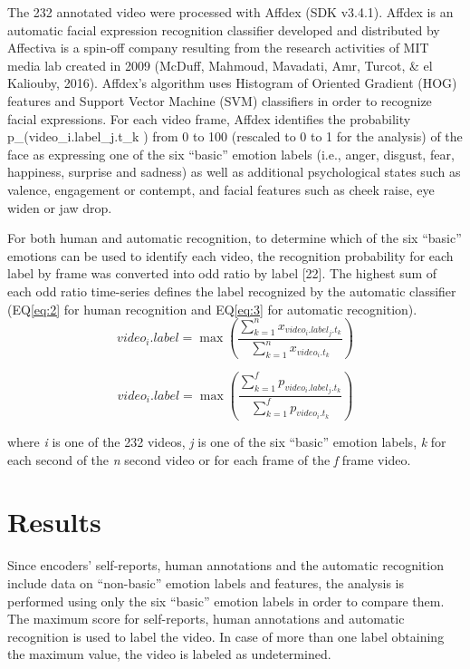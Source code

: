 \documentclass[man]{apa6}
\begin{document}
The 232 annotated video were processed with Affdex (SDK v3.4.1). Affdex is an automatic facial expression recognition classifier developed and distributed by Affectiva is a spin-off company resulting from the research activities of MIT media lab created in 2009 (McDuff, Mahmoud, Mavadati, Amr, Turcot, \& el Kaliouby, 2016). Affdex's algorithm uses Histogram of Oriented Gradient (HOG) features and Support Vector Machine (SVM) classifiers in order to recognize facial expressions. For each video frame, Affdex identifies the probability p\_(video\_i.label\_j.t\_k ) from 0 to 100 (rescaled to 0 to 1 for the analysis) of the face as expressing one of the six \enquote{basic} emotion labels (i.e., anger, disgust, fear, happiness, surprise and sadness) as well as additional psychological states such as valence, engagement or contempt, and facial features such as cheek raise, eye widen or jaw drop.

For both human and automatic recognition, to determine which of the six \enquote{basic} emotions can be used to identify each video, the recognition probability for each label by frame was converted into odd ratio by label {[}22{]}. The highest sum of each odd ratio time-series defines the label recognized by the automatic classifier (EQ\ref{eq:2} for human recognition and EQ\ref{eq:3} for automatic recognition).
\begin{equation}
\label{eq:2}
video_{i}.label = \max\left(\frac{\sum_{k=1}^{n}x_{video_{i}.label_{j}.t_{k}}}{\sum_{k=1}^{n}x_{video_{i}.t_{k}}}\right)
\end{equation}

\begin{equation}
\label{eq:3}
video_{i}.label = \max\left(\frac{\sum_{k=1}^{f}p_{video_{i}.label_{j}.t_{k}}}{\sum_{k=1}^{f}p_{video_{i}.t_{k}}}\right)
\end{equation}

where \emph{i} is one of the 232 videos, \emph{j} is one of the six \enquote{basic} emotion labels, \emph{k} for each second of the \emph{n} second video or for each frame of the \emph{f} frame video.

\hypertarget{results}{%
\section{Results}\label{results}}

Since encoders' self-reports, human annotations and the automatic recognition include data on \enquote{non-basic} emotion labels and features, the analysis is performed using only the six \enquote{basic} emotion labels in order to compare them. The maximum score for self-reports, human annotations and automatic recognition is used to label the video. In case of more than one label obtaining the maximum value, the video is labeled as undetermined.
\end{document}
